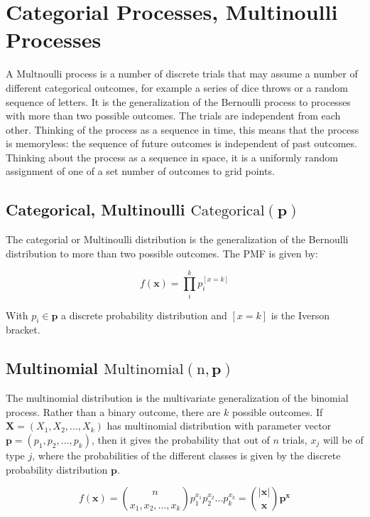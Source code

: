 \section{Categorial Processes, Multinoulli Processes}
A Multnoulli process is a number of discrete trials that may assume a number of different categorical outcomes, for example a series of dice throws or a random sequence of letters. It is the generalization of the Bernoulli process to processes with more than two possible outcomes. The trials are independent from each other. Thinking of the process as a sequence in time, this means that the process is memoryless: the sequence of future outcomes is independent of past outcomes. Thinking about the process as a sequence in space, it is a uniformly random assignment of one of a set number of outcomes to grid points.

\subsection{Categorical, Multinoulli $\mathrm{Categorical(\mathbf{p})}$}
The categorial or Multinoulli distribution is the generalization of the Bernoulli distribution to more than two possible outcomes. The PMF is given by:

\begin{equation}
f(\mathbf{x}) = \prod_i^k p_i^{[x=k]}
\end{equation}

With $p_i \in \mathbf{p}$ a discrete probability distribution and $[x=k]$ is the Iverson bracket.

\subsection{Multinomial $\mathrm{Multinomial(n,\mathbf{p})}$}
The multinomial distribution is the multivariate generalization of the binomial process. Rather than a binary outcome, there are $k$ possible outcomes. If $\mathbf{X}=(X_1,X_2,...,X_k)$ has multinomial distribution with parameter vector $\mathbf{p} = (p_1,p_2,...,p_k)$, then it gives the probability that out of $n$ trials, $x_j$ will be of type $j$, where the probabilities of the different classes is given by the discrete probability distribution $\mathbf{p}$.

\begin{equation}
f(\mathbf{x}) = {n \choose x_1,x_2,...,x_k} p_1^{x_1}p_2^{x_2}...p_k^{x_k} = {|\mathbf{x}|\choose \mathbf{x}}\mathbf{p}^{\mathbf{x}}
\end{equation}

